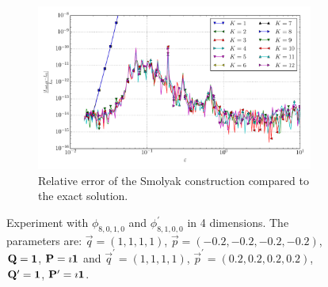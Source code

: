 \documentclass[a4paper,10pt]{article}
\begin{document}
\begin{figure}[ht!]
\begin{subfigure}[t]{0.5\linewidth}
    \includegraphics[width=\linewidth]{./plots/tp_sg_4d_conv_eps_(8,0,1,0)_(8,1,0,0)_err_rel_nsd_gk.pdf}
    \caption{Relative error of the Smolyak construction compared to the exact solution.}
    \label{fig:tp_sg_4d_conv_p_8010_8100_err_rel_nsd_gk}
  \end{subfigure}
  \label{fig:tp_sg_4d_conv_p_8010_8100}
  \caption{Experiment with $\phi_{8,0,1,0}$ and $\phi_{8,1,0,0}^{\prime}$
  in 4 dimensions.
  The parameters are:
  $\vec{q} = (1, 1, 1, 1)$,
  $\vec{p} = (-0.2, -0.2, -0.2, -0.2)$,
  $\mathbf{Q} = \mathbf{1}$,
  $\mathbf{P} = \imath \mathbf{1}$
  and
  $\vec{q}^\prime = (1, 1, 1, 1)$,
  $\vec{p}^\prime = (0.2, 0.2, 0.2, 0.2)$,
  $\mathbf{Q}^\prime = \mathbf{1}$,
  $\mathbf{P}^\prime = \imath \mathbf{1}$.}
\end{figure}
\end{document}
